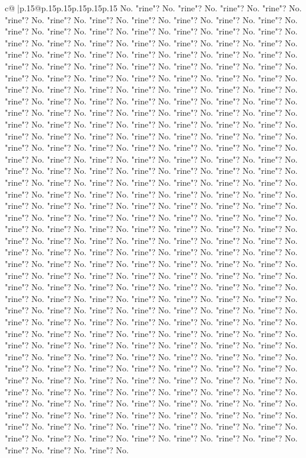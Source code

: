 \documentclass{article}
\begin{document}
{\begin{supertabular}{c@{$\;$}|p{.15\linewidth}@{}p{.15\linewidth}p{.15\linewidth}p{.15\linewidth}p{.15\linewidth}p{.15\linewidth}}
{{{No. "rine"? No. "rine"? No. "rine"? No. "rine"? No. "rine"? No. "rine"? No. "rine"? No. "rine"? No. "rine"? No. "rine"? No. "rine"? No. "rine"? No. "rine"? No. "rine"? No. "rine"? No. "rine"? No. "rine"? No. "rine"? No. "rine"? No. "rine"? No. "rine"? No. "rine"? No. "rine"? No. "rine"? No. "rine"? No. "rine"? No. "rine"? No. "rine"? No. "rine"? No. "rine"? No. "rine"? No. "rine"? No. "rine"? No. "rine"? No. "rine"? No. "rine"? No. "rine"? No. "rine"? No. "rine"? No. "rine"? No. "rine"? No. "rine"? No. "rine"? No. "rine"? No. "rine"? No. "rine"? No. "rine"? No. "rine"? No. "rine"? No. "rine"? No. "rine"? No. "rine"? No. "rine"? No. "rine"? No. "rine"? No. "rine"? No. "rine"? No. "rine"? No. "rine"? No. "rine"? No. "rine"? No. "rine"? No. "rine"? No. "rine"? No. "rine"? No. "rine"? No. "rine"? No. "rine"? No. "rine"? No. "rine"? No. "rine"? No. "rine"? No. "rine"? No. "rine"? No. "rine"? No. "rine"? No. "rine"? No. "rine"? No. "rine"? No. "rine"? No. "rine"? No. "rine"? No. "rine"? No. "rine"? No. "rine"? No. "rine"? No. "rine"? No. "rine"? No. "rine"? No. "rine"? No. "rine"? No. "rine"? No. "rine"? No. "rine"? No. "rine"? No. "rine"? No. "rine"? No. "rine"? No. "rine"? No. "rine"? No. "rine"? No. "rine"? No. "rine"? No. "rine"? No. "rine"? No. "rine"? No. "rine"? No. "rine"? No. "rine"? No. "rine"? No. "rine"? No. "rine"? No. "rine"? No. "rine"? No. "rine"? No. "rine"? No. "rine"? No. "rine"? No. "rine"? No. "rine"? No. "rine"? No. "rine"? No. "rine"? No. "rine"? No. "rine"? No. "rine"? No. "rine"? No. "rine"? No. "rine"? No. "rine"? No. "rine"? No. "rine"? No. "rine"? No. "rine"? No. "rine"? No. "rine"? No. "rine"? No. "rine"? No. "rine"? No. "rine"? No. "rine"? No. "rine"? No. "rine"? No. "rine"? No. "rine"? No. "rine"? No. "rine"? No. "rine"? No. "rine"? No. "rine"? No. "rine"? No. "rine"? No. "rine"? No. "rine"? No. "rine"? No. "rine"? No. "rine"? No. "rine"? No. "rine"? No. "rine"? No. "rine"? No. "rine"? No. "rine"? No. "rine"? No. "rine"? No. "rine"? No. "rine"? No. "rine"? No. "rine"? No. "rine"? No. "rine"? No. "rine"? No. "rine"? No. "rine"? No. "rine"? No. "rine"? No. "rine"? No. "rine"? No. "rine"? No. "rine"? No. "rine"? No. "rine"? No. "rine"? No. "rine"? No. "rine"? No. "rine"? No. "rine"? No. "rine"? No. "rine"? No. "rine"? No. "rine"? No. "rine"? No. "rine"? No. "rine"? No. "rine"? No. "rine"? No. "rine"? No. "rine"? No. "rine"? No. "rine"? No. "rine"? No. "rine"? No. "rine"? No. "rine"? No. "rine"? No. "rine"? No. "rine"? No. "rine"? No. "rine"? No. "rine"? No. "rine"? No. "rine"? No. "rine"? No. "rine"? No. "rine"? No. "rine"? No. "rine"? No. "rine"? No. "rine"? No. "rine"? No. "rine"? No. "rine"? No. "rine"? No. "rine"? No. "rine"? No. "rine"? No. "rine"? No. "rine"? No. "rine"? No. "rine"? No. "rine"? No. "rine"? No. "rine"? No. "rine"? No. "rine"? No. "rine"? No. "rine"? No. "rine"? No. "rine"? No. "rine"? No. "rine"? No. "rine"? No. "rine"? No. "rine"? No. "rine"? No. "rine"? No. "rine"? No. "rine"? No. "rine"? No. "rine"? No. "rine"? No. "rine"? No. "rine"? No. "rine"? No. "rine"? No. "rine"? No. "rine"? No. "rine"? No. "rine"? No. "rine"? No. "rine"? No. "rine"? No. "rine"? No. "rine"? No. "rine"? No. "rine"? No. }}}
\end{supertabular}}
\end{document}
